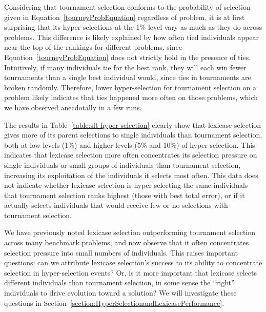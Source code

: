 \documentclass{sig-alternate}
\begin{document}
Considering that tournament selection conforms to the probability of selection given in Equation~\ref{tourneyProbEquation} regardless of problem, it is at first surprising that its hyper-selections at the 1\% level vary as much as they do across problems. This difference is likely explained by how often tied individuals appear near the top of the rankings for different problems, since Equation~\ref{tourneyProbEquation} does not strictly hold in the presence of ties. Intuitively, if many individuals tie for the best rank, they will each win fewer tournaments than a single best individual would, since ties in tournaments are broken randomly. Therefore, lower hyper-selection for tournament selection on a problem likely indicates that ties happened more often on those problems, which we have observed anecdotally in a few runs.


The results in Table~\ref{table:slt-hyper-selection} clearly show that lexicase selection gives more of its parent selections to single individuals than tournament selection, both at low levels (1\%) and higher levels (5\% and 10\%) of hyper-selection. This indicates that lexicase selection more often concentrates its selection pressure on single individuals or small groups of individuals than tournament selection, increasing its exploitation of the individuals it selects most often. This data does not indicate whether lexicase selection is hyper-selecting the same individuals that tournament selection ranks highest (those with best total error), or if it actually selects individuals that would receive few or no selections with tournament selection.

We have previously noted lexicase selection outperforming tournament selection across many benchmark problems, and now observe that it often concentrates selection pressure into small numbers of individuals. This raises important questions: can we attribute lexicase selection's success to its ability to concentrate selection in hyper-selection events? Or, is it more important that lexicase selects different individuals than tournament selection, in some sense the ``right'' individuals to drive evolution toward a solution? We will investigate these questions in Section~\ref{section:HyperSelectionandLexicasePerformance}.
\end{document}
